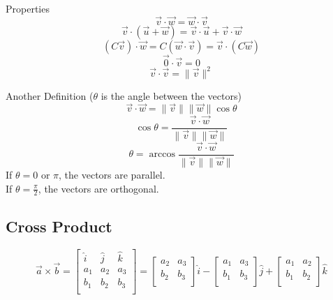\documentclass[12pt]{article}
\numberwithin{equation}{subsection}
\newcommand{\magp}[1]{\| #1 \|}
\begin{document}
\begin{flushleft}
Properties
\begin{equation}
\vec{v} \cdot \vec{w} = \vec{w} \cdot \vec{v} 
\end{equation}
\begin{equation}
\vec{v} \cdot (\vec{u} + \vec{w}) = \vec{v} \cdot \vec{u} +\vec{v} \cdot \vec{w}
\end{equation}
\begin{equation}
(C\vec{v}) \cdot \vec{w} = C(\vec{w} \cdot \vec{v})=  \vec{v} \cdot (C\vec{w})
\end{equation}
\begin{equation}
\vec{0} \cdot \vec{v}= 0
\end{equation}
\begin{equation}
\vec{v} \cdot \vec{v} = \magp{\vec{v}}^{2}
\end{equation}


Another Definition ($\theta$ is the angle between the vectors)
\begin{equation}
\vec{v} \cdot \vec{w} = \magp{\vec{v}} \magp{\vec{w}} \cos{\theta}
\end{equation}
\begin{equation}
\cos{\theta }= \frac{\vec{v} \cdot \vec{w}}{\magp{\vec{v}} \magp{\vec{w}}}
\end{equation}
\begin{equation}
\theta= \arccos{\frac{\vec{v} \cdot \vec{w}}{\magp{\vec{v}} \magp{\vec{w}}}}
\end{equation}
If $\theta=0$ or $\pi$, the vectors are parallel.\\ 
If $\theta=\frac{\pi}{2}$, the vectors are orthogonal.



\newpage

\subsection{Cross Product}
\begin{equation}
\vec{a} \times \vec{b}=
\begin{bmatrix}
\hat{i} & \hat{j} & \hat{k} \\
a_{1} & a_{2} & a_{3} \\
b_{1} & b_{2} & b_{3} \\
\end{bmatrix} 
=\begin{bmatrix}
a_{2} & a_{3} \\
b_{2} & b_{3} \\
\end{bmatrix} \hat{i} -
\begin{bmatrix}
a_{1} & a_{3} \\
b_{1} & b_{3} \\
\end{bmatrix}\hat{j}+
\begin{bmatrix}
a_{1} & a_{2} \\
b_{1} & b_{2} \\
\end{bmatrix} \hat{k}
\end{equation}


\end{flushleft}
\end{document}
